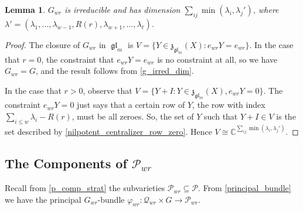 \documentclass[12pt,psamsfonts]{article}
\DeclareMathOperator{\gl}{\mathfrak{gl}}
\newtheorem{lemma}[theorem]{Lemma}
\begin{document}
\begin{lemma}\label{gwr_irred_dim}
    \(G_{wr}\) is irreducible and has dimension \(\sum_{ij} \min(\lambda_i, \lambda_j')\), where \(\lambda' = (\lambda_1, ..., \lambda_{w - 1}, R(r), \lambda_{w + 1}, ..., \lambda_\ell)\).
\end{lemma}
\begin{proof}
    The closure of \(G_{wr}\) in \(\gl_m\) is \(V = \{Y \in \mathfrak{z}_{\gl_m}(X) : e_{wr} Y = e_{wr}\}\).
    In the case that \(r = 0\), the constraint that \(e_{wr}Y = e_{wr}\) is no constraint at all, so we have \(G_{wr} = G\), and the result follows from \cref{g_irred_dim}.
    \par In the case that \(r > 0\), observe that \(V = \{Y + I : Y \in \mathfrak{z}_{\gl_m}(X), e_{wr}Y = 0\}\).
    The constraint \(e_{wr}Y = 0\) just says that a certain row of \(Y\), the row with index \(\sum_{i \leq w} \lambda_i - R(r)\), must be all zeroes.
    So, the set of \(Y\) such that \(Y + I \in V\) is the set described by \cref{nilpotent_centralizer_row_zero}.
    Hence \(V \cong \mathbb{C}^{\sum_{ij}\min(\lambda_i, \lambda_j')}\).
\end{proof}

\subsection{The Components of \texorpdfstring{\(\mathcal{P}_{wr}\)}{P\_\{wr\}}}
Recall from \cref{p_comp_strat} the subvarieties \(\mathcal{P}_{wr} \subseteq \mathcal{P}\).
From \cref{principal_bundle} we have the principal \(G_{wr}\)-bundle \(\varphi_{wr} : \mathcal{Q}_{wr} \times G \to \mathcal{P}_{wr}\).
\end{document}
